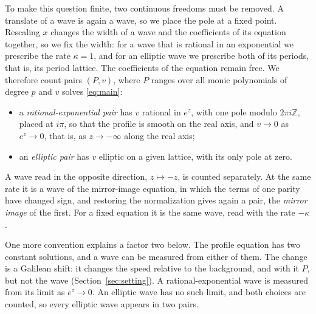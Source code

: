 \documentclass[11pt]{article}
\theoremstyle{definition}
\theoremstyle{remark}
\newcommand{\ZZ}{\mathbb Z}
\numberwithin{equation}{section}
\begin{document}
To make this question finite, two continuous freedoms must be removed. A
translate of a wave is again a wave, so we place the pole at a fixed
point. Rescaling \(x\) changes the width of a wave and the coefficients
of its equation together, so we fix the width: for a wave that is
rational in an exponential we prescribe the rate \(\kappa=1\), and for
an elliptic wave we prescribe both of its periods, that is, its period
lattice. The coefficients of the equation remain free. We therefore
count pairs \((P,v)\), where \(P\) ranges over all monic polynomials of
degree \(p\) and \(v\) solves \eqref{eq:main}:
\begin{itemize}\setlength{\itemsep}{0pt}\setlength{\parsep}{0pt}
\item a \emph{rational-exponential pair} has \(v\) rational in \(e^z\),
with one pole modulo \(2\pi i\ZZ\), placed at \(i\pi\), so that the
profile is smooth on the real axis, and \(v\to0\) as \(e^z\to0\), that
is, as \(z\to-\infty\) along the real axis;
\item an \emph{elliptic pair} has \(v\) elliptic on a given lattice,
with its only pole at zero.
\end{itemize}
A wave read in the opposite direction, \(z\mapsto-z\), is counted
separately. At the same rate it is a wave of the mirror-image equation,
in which the terms of one parity have changed sign, and restoring the
normalization gives again a pair, the \emph{mirror image} of the first.
For a fixed equation it is the same wave, read with the rate
\(-\kappa\).

One more convention explains a factor two below. The profile equation
has two constant solutions, and a wave can be measured from either of
them. The change is a Galilean shift: it changes the speed relative to
the background, and with it \(P\), but not the wave
(Section~\ref{sec:setting}). A rational-exponential wave is measured
from its limit as \(e^z\to0\). An elliptic wave has no such limit, and
both choices are counted, so every elliptic wave appears in two pairs.
\end{document}
